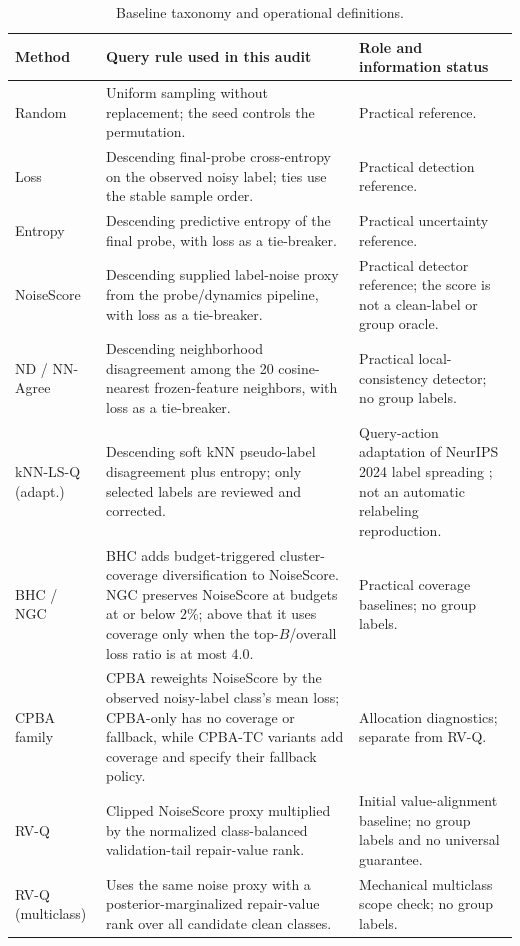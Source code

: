 \documentclass{article}
\begin{document}
\begin{table}[H]
\caption{Baseline taxonomy and operational definitions.}
\label{tab:baseline-taxonomy}
\centering
\scriptsize
\setlength{\tabcolsep}{2.5pt}
\begin{tabular}{p{}p{}p{}}
\toprule
Method & Query rule used in this audit & Role and information status \\
\midrule
Random & Uniform sampling without replacement; the seed controls the permutation. & Practical reference. \\
Loss & Descending final-probe cross-entropy on the observed noisy label; ties use the stable sample order. & Practical detection reference. \\
Entropy & Descending predictive entropy of the final probe, with loss as a tie-breaker. & Practical uncertainty reference. \\
NoiseScore & Descending supplied label-noise proxy from the probe/dynamics pipeline, with loss as a tie-breaker. & Practical detector reference; the score is not a clean-label or group oracle. \\
ND / NN-Agree & Descending neighborhood disagreement among the 20 cosine-nearest frozen-feature neighbors, with loss as a tie-breaker. & Practical local-consistency detector; no group labels. \\
kNN-LS-Q (adapt.) & Descending soft kNN pseudo-label disagreement plus entropy; only selected labels are reviewed and corrected. & Query-action adaptation of NeurIPS 2024 label spreading \citep{stromberg2024enhancing}; not an automatic relabeling reproduction. \\
BHC / NGC & BHC adds budget-triggered cluster-coverage diversification to NoiseScore. NGC preserves NoiseScore at budgets at or below $2\%$; above that it uses coverage only when the top-$B$/overall loss ratio is at most $4.0$. & Practical coverage baselines; no group labels. \\
CPBA family & CPBA reweights NoiseScore by the observed noisy-label class's mean loss; CPBA-only has no coverage or fallback, while CPBA-TC variants add coverage and specify their fallback policy. & Allocation diagnostics; separate from RV-Q. \\
RV-Q & Clipped NoiseScore proxy multiplied by the normalized class-balanced validation-tail repair-value rank. & Initial value-alignment baseline; no group labels and no universal guarantee. \\
RV-Q (multiclass) & Uses the same noise proxy with a posterior-marginalized repair-value rank over all candidate clean classes. & Mechanical multiclass scope check; no group labels. \\

\end{tabular}
\end{table}
\end{document}
